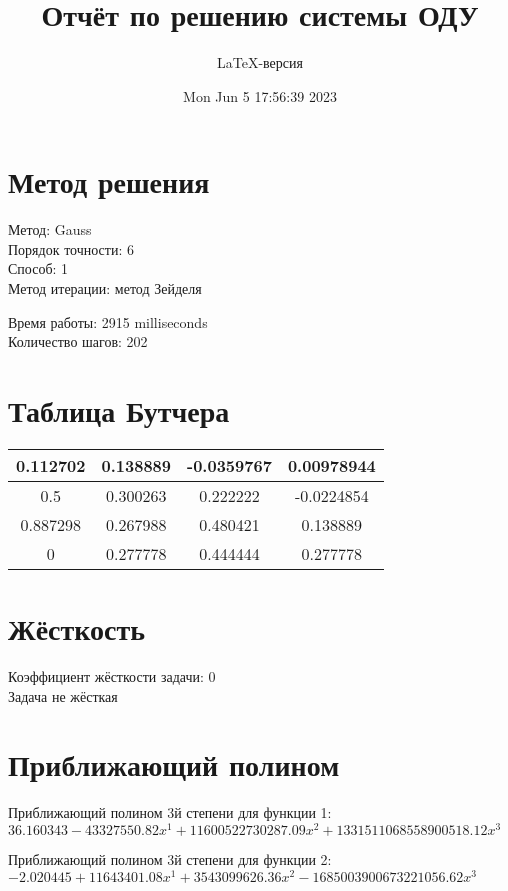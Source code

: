 \documentclass[a4paper,14pt]{extarticle}
\title{Отчёт по решению системы ОДУ}
\author{LaTeX-версия}
\date{Mon Jun  5 17:56:39 2023}
\begin{document}
\maketitle

\tableofcontents
\pagebreak

\section{Метод решения}

Метод: Gauss\\
Порядок точности: 6\\
Способ: 1\\
Метод итерации: метод Зейделя

Время работы: 2915 milliseconds\\
Количество шагов: 202\\
\section{Таблица Бутчера}

\begin{table}[h]
\centering
\begin{tabular}{|c||c|c|c|}
\hline
0.112702 & 0.138889 & -0.0359767 & 0.00978944\\
\hline
0.5 & 0.300263 & 0.222222 & -0.0224854\\
\hline
0.887298 & 0.267988 & 0.480421 & 0.138889\\
\hline
0 & \cellcolor{lightgray} 0.277778 & \cellcolor{lightgray} 0.444444 & \cellcolor{lightgray} 0.277778\\
\hline
\end{tabular}
\end{table}

\section{Жёсткость}

Коэффициент жёсткости задачи: 0\\
Задача не жёсткая

\section{Приближающий полином}

Приближающий полином 3й степени для функции 1: $36.160343 - 43327550.82x^1 + 11600522730287.09x^2 + 1331511068558900518.12x^3$

Приближающий полином 3й степени для функции 2: $-2.020445 + 11643401.08x^1 + 3543099626.36x^2 - 1685003900673221056.62x^3$
\end{document}
